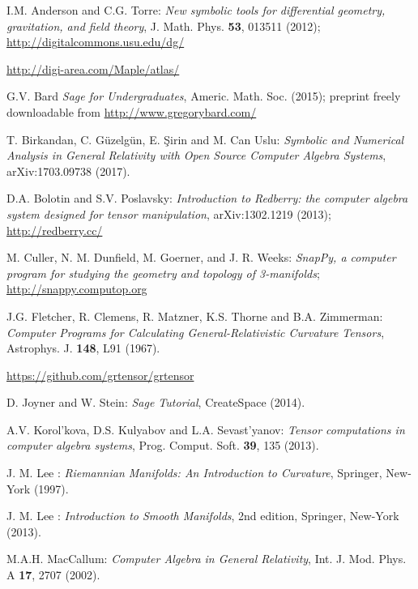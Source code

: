\begin{thebibliography}{123}

I.M. Anderson and C.G. Torre:
{\em New symbolic tools for differential geometry, gravitation,
and field theory},
J. Math. Phys. {\bf 53}, 013511 (2012);\\
\url{http://digitalcommons.usu.edu/dg/}

\url{http://digi-area.com/Maple/atlas/}

G.V. Bard {\it Sage for Undergraduates}, Americ. Math. Soc. (2015);
preprint freely downloadable from \url{http://www.gregorybard.com/}

T. Birkandan, C. Güzelgün, E. Şirin and M. Can Uslu:
{\em Symbolic and Numerical Analysis in General Relativity with Open Source Computer Algebra Systems},
arXiv:1703.09738 (2017).

D.A. Bolotin and S.V. Poslavsky: \emph{Introduction to Redberry: the computer algebra system designed for tensor manipulation}, arXiv:1302.1219 (2013);\\
\url{http://redberry.cc/}

M. Culler, N. M. Dunfield, M. Goerner, and J. R. Weeks: {\em SnapPy, a computer program for studying the geometry and topology of 3-manifolds};\\
\url{http://snappy.computop.org}

J.G. Fletcher, R. Clemens, R. Matzner, K.S. Thorne and B.A. Zimmerman:
{\em Computer Programs for Calculating General-Relativistic Curvature Tensors},
Astrophys. J. {\bf 148}, L91 (1967).

\url{https://github.com/grtensor/grtensor}

D. Joyner and W. Stein: {\it Sage Tutorial}, CreateSpace (2014).

A.V. Korol'kova, D.S. Kulyabov and L.A. Sevast'yanov:
{\em Tensor computations in computer algebra systems},
Prog. Comput. Soft.
{\bf 39}, 135 (2013).

J. M. Lee : {\em Riemannian Manifolds: An Introduction to Curvature},
Springer, New-York (1997).

J. M. Lee : {\em Introduction to Smooth Manifolds}, 2nd edition,
Springer, New-York (2013).

M.A.H. MacCallum: {\em Computer Algebra in General Relativity},
Int. J. Mod. Phys. A {\bf 17}, 2707 (2002).


\end{thebibliography}
